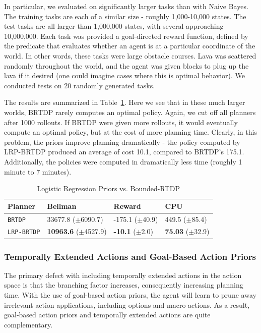 \documentclass[11pt]{article}
\begin{document}
In particular, we evaluated on significantly larger tasks than with Naive Bayes. The training tasks are each of a similar size - roughly 1,000-10,000 states. The test tasks are all larger than 1,000,000 states, with several approaching 10,000,000. Each task was provided a goal-directed reward function, defined by the predicate that evaluates whether an agent is at a particular coordinate of the world. In other words, these tasks were large obstacle courses. Lava was scattered randomly throughout the world, and the agent was given blocks to plug up the lava if it desired (one could imagine cases where this is optimal behavior). We conducted tests on 20 randomly generated tasks.

The results are summarized in Table~\ref{table:log_reg_results}. Here we see that in these much larger worlds, BRTDP rarely computes an optimal policy. Again, we cut off all planners after 1000 rollouts. If BRTDP were given more rollouts, it would eventually compute an optimal policy, but at the cost of more planning time. Clearly, in this problem, the priors improve planning dramatically - the policy computed by LRP-BRTDP produced an average of cost 10.1, compared to BRTDP's  175.1. Additionally, the policies were computed in dramatically less time (roughly 1 minute to 7 minutes).

\begin{table}
\centering
{}
\small
\begin{tabular}{@{}llll@{}}\toprule
Planner & Bellman & Reward & CPU \\ \midrule
\texttt{BRTDP}   			&	33677.8 ($\pm$6090.7)		&	-175.1 ($\pm$40.9)	& 449.5 ($\pm$85.4) \\
\texttt{LRP-BRTDP} 			& 	{\bf 10963.6} ($\pm$4527.9)	&	{\bf -10.1} ($\pm$2.0)& {\bf 75.03} ($\pm$32.9) \\ \hline
\end{tabular}
\caption{Logistic Regression Priors vs. Bounded-RTDP}
\label{table:log_reg_results}
\end{table}


\subsubsection{Temporally Extended Actions and Goal-Based Action Priors}

The primary defect with including temporally extended actions in the action space is that the branching factor increases, consequently increasing planning time. With the use of goal-based action priors, the agent will learn to prune away irrelevant action applications, including options and macro actions. As a result, goal-based action priors and temporally extended actions are quite complementary.
\end{document}
